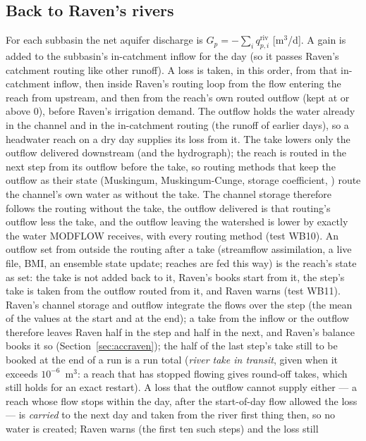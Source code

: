 \subsection{Back to Raven's rivers}\label{sec:riverback}
For each subbasin the net aquifer discharge is $G_p=-\sum_i q^{\mathrm{riv}}_{p,i}$ [m$^3$/d]. A gain is added to the
subbasin's in-catchment inflow for the day (so it passes Raven's catchment routing like other runoff). A loss is taken,
in this order, from that in-catchment inflow, then inside Raven's routing loop from the flow entering the reach from
upstream, and then from the reach's own routed outflow (kept at or above 0), before Raven's irrigation demand. The
outflow holds the water already in the channel and in the in-catchment routing (the runoff of earlier days), so a
headwater reach on a dry day supplies its loss from it. The take lowers only the outflow delivered downstream (and the
hydrograph); the reach is routed in the next step from its outflow before the take, so routing methods that keep the
outflow as their state (Muskingum, Muskingum-Cunge, storage coefficient, ) route the channel's
own water as without the take. The channel storage therefore follows the routing without the take, the outflow
delivered is that routing's outflow less the take, and the outflow leaving the watershed is lower by exactly the water
MODFLOW receives, with every routing method (test WB10). An outflow set from outside the routing after a take
(streamflow assimilation, a live file, BMI, an ensemble state update;  reaches are fed this way) is
the reach's state as set: the take is not added back to it, Raven's books start from it, the step's take is taken from
the outflow routed from it, and Raven warns (test WB11). Raven's channel storage and outflow integrate the flows over
the step (the mean of the values at the start and at the end); a take from the inflow or the outflow therefore leaves
Raven half in the step and half in the next, and Raven's balance books it so (Section~\ref{sec:accraven}); the half of
the last step's take still to be booked at the end of a run is a run total (\emph{river take in transit}, given when it
exceeds $10^{-6}$~m$^3$: a reach that has stopped flowing gives round-off takes, which  still holds for
an exact restart). A loss that the outflow cannot supply either --- a reach whose
flow stops within the day, after the start-of-day flow allowed the loss --- is \emph{carried} to the next day and taken
from the river first thing then, so no water is created; Raven warns (the first ten such steps) and the loss still
